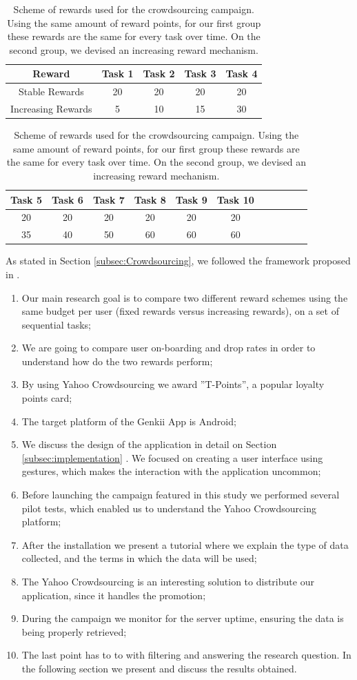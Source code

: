 \documentclass[letterpaper]{article}
\begin{document}
\begin{table}[!h]
	\caption{ Scheme of rewards used for the crowdsourcing campaign. Using the same amount of reward points, for our first group these rewards are the same for every task over time. On the second group, we devised an increasing reward mechanism. }
	\begin{center}
\begin{tabular}{|c|c|c|c|c|}
	\hline  Reward & Task 1  & Task 2  & Task 3  & Task 4 \\ 
	\hline  Stable Rewards & 20 & 20 & 20 & 20  \\ 
	\hline Increasing Rewards & 5 & 10 & 15 & 30  \\ 
	\hline 
\end{tabular} 

\begin{tabular}{|c|c|c|c|c|c|c|c|c|c|c|}
	\hline   Task 5 & Task 6 & Task 7 & Task 8 & Task 9 & Task 10 \\ 
	\hline   20 & 20 & 20 & 20 & 20 & 20 \\ 
	\hline   35 & 40 & 50 & 60 & 60 & 60 \\ 
	\hline 
\end{tabular} 
\end{center}
\label{tab:rewards}
\end{table}

As stated in Section \ref{subsec:Crowdsourcing}, we followed the framework proposed in \cite{Henze2013}.
\begin{enumerate}
	\item Our main research goal is to compare two different reward schemes using the same budget per user (fixed rewards versus increasing rewards), on a set of sequential tasks;
	\item We are going to compare user on-boarding and drop rates in order to understand how do the two rewards perform;
	\item By using Yahoo Crowdsourcing we award ''T-Points'', a popular loyalty points card;
	\item The target platform of the Genkii App is Android;
	\item We discuss the design of the application in detail on Section \ref{subsec:implementation} . We focused on creating a user interface using gestures, which makes the interaction with the application uncommon;
	\item Before launching the campaign featured in this study we performed several pilot tests, which enabled us to understand the Yahoo Crowdsourcing platform; 
	\item After the installation we present a tutorial where we explain the type of data collected, and the terms in which the data will be used;
	\item The Yahoo Crowdsourcing is an interesting solution to distribute our application, since it handles the promotion;
	\item During the campaign we monitor for the server uptime, ensuring the data is being properly retrieved;
	\item The last point has to to with filtering and answering the research question. In the following section we present and discuss the results obtained.
\end{enumerate}
\end{document}
